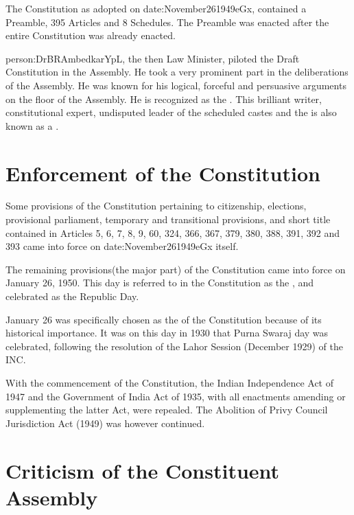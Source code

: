 { The Constitution as adopted on \gls{date:November261949eGx}, contained a Preamble, 395 Articles and 8 Schedules}. The Preamble was enacted after the entire Constitution was already enacted.

\gls{person:DrBRAmbedkarYpL}, the then Law Minister, piloted the Draft Constitution in the Assembly. He took a very prominent part in the deliberations of the Assembly. He was known for his logical, forceful and persuasive arguments on the floor of the Assembly. He is recognized as the . This brilliant writer, constitutional expert, undisputed leader of the scheduled castes and the  is also known as a .

\section{Enforcement of the Constitution}

Some provisions of the Constitution pertaining to citizenship, elections, provisional parliament, temporary and transitional provisions, and short title contained in Articles 5, 6, 7, 8, 9, 60, 324, 366, 367, 379, 380, 388, 391, 392 and 393 came into force on \gls{date:November261949eGx} itself.

The remaining provisions(the major part) of the Constitution came into force on January 26, 1950. This day is referred to in the Constitution as the , and celebrated as the Republic Day.

January 26 was specifically chosen as the  of the Constitution because of its historical importance. It was on this day in 1930 that { Purna Swaraj} day was celebrated, following the resolution of the Lahor Session (December 1929) of the INC.

With the commencement of the Constitution, the Indian Independence Act of 1947 and the Government of India Act of 1935, with all enactments amending or supplementing the latter Act, were repealed. The Abolition of Privy Council Jurisdiction Act (1949) was however continued.

\section{Criticism of the Constituent Assembly}

